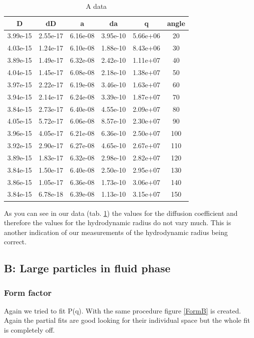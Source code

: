 \documentclass[]{article}
\begin{document}
\begin{table}[!htbp]
	\centering
	\begin{tabular}{|c|c|c|c|c|c|}
		\hline
		D & dD & a & da & q & angle \\ \hline\hline
		3.99e-15 & 2.55e-17 & 6.16e-08 & 3.95e-10 & 5.66e+06 & 20 \\ \hline
		4.03e-15 & 1.24e-17 & 6.10e-08 & 1.88e-10 & 8.43e+06 & 30 \\ \hline
		3.89e-15 & 1.49e-17 & 6.32e-08 & 2.42e-10 & 1.11e+07 & 40 \\ \hline
		4.04e-15 & 1.45e-17 & 6.08e-08 & 2.18e-10 & 1.38e+07 & 50 \\ \hline
		3.97e-15 & 2.22e-17 & 6.19e-08 & 3.46e-10 & 1.63e+07 & 60 \\ \hline
		3.94e-15 & 2.14e-17 & 6.24e-08 & 3.39e-10 & 1.87e+07 & 70 \\ \hline
		3.84e-15 & 2.73e-17 & 6.40e-08 & 4.55e-10 & 2.09e+07 & 80 \\ \hline
		4.05e-15 & 5.72e-17 & 6.06e-08 & 8.57e-10 & 2.30e+07 & 90 \\ \hline
		3.96e-15 & 4.05e-17 & 6.21e-08 & 6.36e-10 & 2.50e+07 & 100 \\ \hline
		3.92e-15 & 2.90e-17 & 6.27e-08 & 4.65e-10 & 2.67e+07 & 110 \\ \hline
		3.89e-15 & 1.83e-17 & 6.32e-08 & 2.98e-10 & 2.82e+07 & 120 \\ \hline
		3.84e-15 & 1.50e-17 & 6.40e-08 & 2.50e-10 & 2.95e+07 & 130 \\ \hline
		3.86e-15 & 1.05e-17 & 6.36e-08 & 1.73e-10 & 3.06e+07 & 140 \\ \hline
		3.84e-15 & 6.78e-18 & 6.39e-08 & 1.13e-10 & 3.15e+07 & 150 \\ \hline
		\hline
	\end{tabular}
	\caption{A data}
	\label{tab:adata}
\end{table}
As you can see in our data (tab. \ref{tab:adata}) the values for the diffusion coefficient and therefore the values for the hydrodynamic radius do not vary much. This is another indication of our measurements of the hydrodynamic radius being correct. 

\subsection{B: Large particles in fluid phase}
\subsubsection{Form factor}
Again we tried to fit P(q). With the same procedure figure \ref{FormB} is created. Again the partial fits are good looking for their individual space but the whole fit is completely off.
\end{document}
